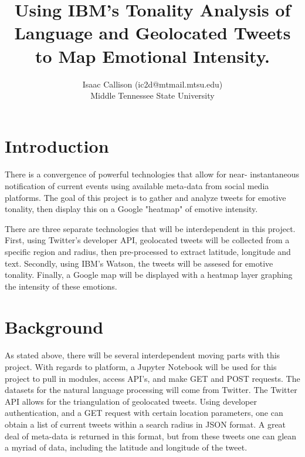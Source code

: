 \documentclass[12pt, oneside]{article}
\title{Using IBM's Tonality Analysis of Language and Geolocated Tweets to Map Emotional Intensity.
\\\medskip}
\author{Isaac Callison (ic2d@mtmail.mtsu.edu)\\Middle Tennessee State University}
\begin{document}
\maketitle
\nocite{*}
\newpage{}


\renewenvironment{abstract}
 {\small
  \begin{center}
  \bfseries \abstractname\vspace{-.5em}\vspace{0pt}
  \end{center}
  \list{}{
    \setlength{\leftmargin}{.8cm}%
    \setlength{\rightmargin}{\leftmargin}%
  }%
  \item\relax}
 {\endlist}

\begin{abstract}

\end{abstract}



\section{Introduction}
\paragraph{}
There is a convergence of powerful technologies that allow for near-
instantaneous notification of current events using available meta-data from
social media platforms. The goal of this project is to gather and analyze
tweets for emotive tonality, then display this on a Google "heatmap" of emotive
intensity.

There are three separate technologies that will be interdependent in this
project. First, using Twitter's developer API, geolocated tweets will be
collected from a specific region and radius, then pre-processed to extract
latitude, longitude and text. Secondly, using IBM's Watson, the tweets will be
assesed for emotive tonality. Finally, a Google map will be displayed with a
heatmap layer graphing the intensity of these emotions.


\section{Background}
\paragraph{}
As stated above, there will be several interdependent moving parts with this
project. With regards to platform, a Jupyter Notebook will be used for this
project to pull in modules, access API's, and make GET and POST requests.
The datasets for the natural language processing will come from Twitter. The
Twitter API allows for the triangulation of geolocated tweets\cite{TwitterGeo}.
Using developer authentication, and a GET request with certain location
parameters, one can obtain a list of current tweets within a search radius in
JSON format. A great deal of meta-data is returned in this format, but from
these tweets one can glean a myriad of data, including the latitude and
longitude of the tweet.
\end{document}
